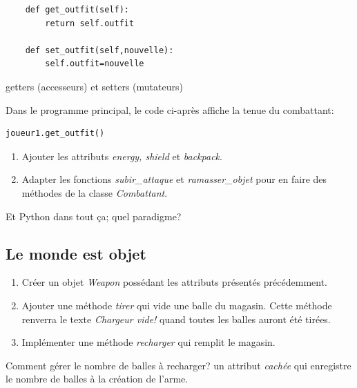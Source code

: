 \documentclass[a4paper,11pt]{article}
\begin{document}
\begin{Form}
\begin{lstlisting}
	def get_outfit(self):
		return self.outfit
	
	def set_outfit(self,nouvelle):
		self.outfit=nouvelle
\end{lstlisting}
\begin{commentprof}
getters (accesseurs) et setters (mutateurs)
\end{commentprof}
Dans le programme principal, le code ci-après affiche la tenue du combattant:
\begin{lstlisting}
joueur1.get_outfit()
\end{lstlisting}
\begin{activite}
\begin{enumerate}
\item Ajouter les attributs \emph{energy, shield} et \emph{backpack}.
\item Adapter les fonctions \emph{subir\_attaque} et \emph{ramasser\_objet} pour en faire des méthodes de la classe \emph{Combattant}.
\end{enumerate}
\end{activite}
\begin{commentprof}
Et Python dans tout ça; quel paradigme?
\end{commentprof}
\subsection{Le monde est objet}
\begin{activite}
\begin{enumerate}
\item Créer un objet \emph{Weapon} possédant les attributs présentés précédemment.
\item Ajouter une méthode \emph{tirer} qui vide une balle du magasin. Cette méthode renverra le texte \emph{Chargeur vide!} quand toutes les balles auront été tirées.
\item Implémenter une méthode \emph{recharger} qui remplit le magasin.
\end{enumerate}
\end{activite}
\begin{commentprof}
Comment gérer le nombre de balles à recharger? un attribut \emph{cachée} qui enregistre le nombre de balles à la création de l'arme.
\end{commentprof}
\end{Form}
\end{document}
